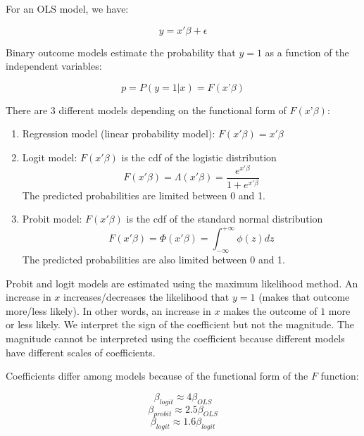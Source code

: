 For an OLS model, we have:

\begin{equation}
    y = x'\beta + \epsilon
\end{equation}

Binary outcome models estimate the probability that $y=1$ as a function of the independent
variables:

\begin{equation}
    p = P(y=1 | x) = F(x’\beta)
\end{equation}

There are 3 different models depending on the functional form of $F(x’\beta)$:

\begin{enumerate}
    \item Regression model (linear probability model): $F(x'\beta) = x'\beta$
    \item Logit model: $F(x'\beta)$ is the cdf of the logistic distribution
    \begin{equation}
        F(x'\beta) = \Lambda(x'\beta) = \frac{e^{x'\beta}}{1+e^{x'\beta}}
    \end{equation}
    The predicted probabilities are limited between 0 and 1.
    \item Probit model: $F(x'\beta)$ is the cdf of the standard normal distribution
    \begin{equation}
        F(x'\beta) = \Phi(x'\beta) = \int_{-\infty}^{+\infty} \phi(z)dz
    \end{equation}
    The predicted probabilities are also limited between 0 and 1.
\end{enumerate}


Probit and logit models are estimated using the maximum likelihood method. An increase in $x$
increases/decreases the likelihood that $y=1$ (makes that outcome more/less likely). In other words,
an increase in $x$ makes the outcome of $1$ more or less likely. We interpret the sign of the
coefficient but not the magnitude. The magnitude cannot be interpreted using the coefficient because
different models have different scales of coefficients.

Coefficients differ among models because of the functional form of the $F$ function:

$$\beta_{logit} \approx 4\beta_{OLS}$$
$$\beta_{probit} \approx 2.5\beta_{OLS}$$
$$\beta_{logit} \approx 1.6\beta_{logit}$$


